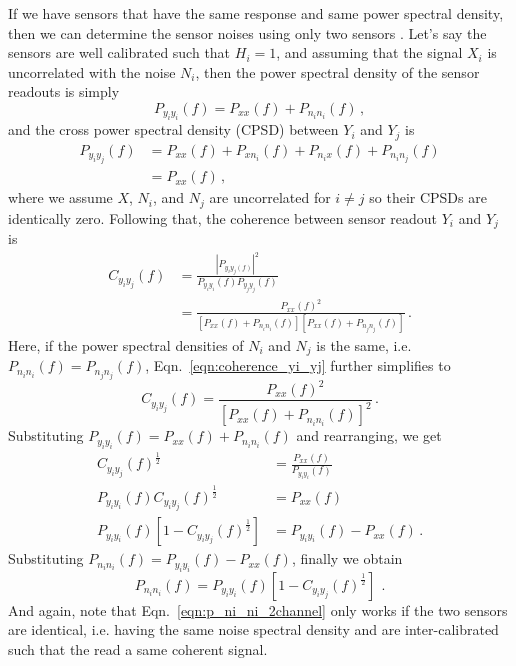 If we have sensors that have the same response and same power spectral density, then we can determine the sensor noises using only two sensors \cite{technique_for_measurement_of_the_noise}.
Let's say the sensors are well calibrated such that $H_i=1$, and assuming that the signal $X_i$ is uncorrelated with the noise $N_i$, then the power spectral density of the sensor readouts is simply
\begin{equation}
	P_{y_iy_i}(f) = P_{xx}(f) + P_{n_i n_i}(f)\,,
\end{equation}
and the cross power spectral density (CPSD) between $Y_i$ and $Y_j$ is
\begin{equation}
	\begin{split}
		P_{y_iy_j}(f) &= P_{xx}(f) + P_{xn_i}(f) + P_{n_ix}(f) + P_{n_in_j}(f) \\
		&= P_{xx}(f)\,,
	\end{split}
\end{equation}
where we assume $X$, $N_i$, and $N_j$ are uncorrelated for $i\neq j$ so their CPSDs are identically zero.
Following that, the coherence between sensor readout $Y_i$ and $Y_j$ is
\begin{equation}
	\begin{split}
		C_{y_iy_j}(f) &= \frac{\left\lvert P_{y_iy_j(f)}\right\rvert^2}{P_{y_iy_i}(f)P_{y_jy_j}(f)}\\
		&= \frac{P_{xx}(f)^2}{\left[P_{xx}(f)+P_{n_i n_i}(f)\right]\left[P_{xx}(f)+P_{n_j n_j}(f)\right]} \,.
	\end{split}
	\label{eqn:coherence_yi_yj}
\end{equation}
Here, if the power spectral densities of $N_i$ and $N_j$ is the same, i.e. $P_{n_in_i}(f)=P_{n_jn_j}(f)$, Eqn.~\eqref{eqn:coherence_yi_yj} further simplifies to
\begin{equation}
	C_{y_iy_j}(f) = \frac{P_{xx}(f)^2}{\left[P_{xx}(f)+P_{n_i n_i}(f)\right]^2}\,.
\end{equation}
Substituting $P_{y_i y_i}(f) = P_{xx}(f) + P_{n_i n_i}(f)$ and rearranging, we get
\begin{equation}
	\begin{split}
		C_{y_iy_j}(f)^\frac{1}{2} &= \frac{P_{xx}(f)}{P_{y_iy_i}(f)} \\
		P_{y_iy_i}(f)C_{y_iy_j}(f)^\frac{1}{2} &= P_{xx}(f) \\
		P_{y_iy_i}(f)\left[1-C_{y_iy_j}(f)^\frac{1}{2}\right] &= P_{y_iy_i}(f) - P_{xx}(f)\,.
	\end{split}
\end{equation}
Substituting $P_{n_i n_i}(f) = P_{y_i y_i}(f) - P_{xx}(f)$, finally we obtain
\begin{equation}
	\boxed{
		P_{n_i n_i}(f) = P_{y_iy_i}(f)\left[1-C_{y_iy_j}(f)^\frac{1}{2}\right]
	}\,\ .
	\label{eqn:p_ni_ni_2channel}
\end{equation}
And again, note that Eqn.~\eqref{eqn:p_ni_ni_2channel} only works if the two sensors are identical, i.e. having the same noise spectral density and are inter-calibrated such that the read a same coherent signal.

